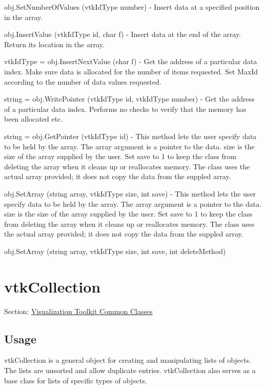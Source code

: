 \begin{DoxyItemize}
\item {\ttfamily obj.\-Set\-Number\-Of\-Values (vtk\-Id\-Type number)} -\/ Insert data at a specified position in the array.  
\item {\ttfamily obj.\-Insert\-Value (vtk\-Id\-Type id, char f)} -\/ Insert data at the end of the array. Return its location in the array.  
\item {\ttfamily vtk\-Id\-Type = obj.\-Insert\-Next\-Value (char f)} -\/ Get the address of a particular data index. Make sure data is allocated for the number of items requested. Set Max\-Id according to the number of data values requested.  
\item {\ttfamily string = obj.\-Write\-Pointer (vtk\-Id\-Type id, vtk\-Id\-Type number)} -\/ Get the address of a particular data index. Performs no checks to verify that the memory has been allocated etc.  
\item {\ttfamily string = obj.\-Get\-Pointer (vtk\-Id\-Type id)} -\/ This method lets the user specify data to be held by the array. The array argument is a pointer to the data. size is the size of the array supplied by the user. Set save to 1 to keep the class from deleting the array when it cleans up or reallocates memory. The class uses the actual array provided; it does not copy the data from the suppled array.  
\item {\ttfamily obj.\-Set\-Array (string array, vtk\-Id\-Type size, int save)} -\/ This method lets the user specify data to be held by the array. The array argument is a pointer to the data. size is the size of the array supplied by the user. Set save to 1 to keep the class from deleting the array when it cleans up or reallocates memory. The class uses the actual array provided; it does not copy the data from the suppled array.  
\item {\ttfamily obj.\-Set\-Array (string array, vtk\-Id\-Type size, int save, int delete\-Method)}  
\end{DoxyItemize}\hypertarget{vtkcommon_vtkcollection}{}\section{vtk\-Collection}\label{vtkcommon_vtkcollection}
Section\-: \hyperlink{sec_vtkcommon}{Visualization Toolkit Common Classes} \hypertarget{vtkwidgets_vtkxyplotwidget_Usage}{}\subsection{Usage}\label{vtkwidgets_vtkxyplotwidget_Usage}
vtk\-Collection is a general object for creating and manipulating lists of objects. The lists are unsorted and allow duplicate entries. vtk\-Collection also serves as a base class for lists of specific types of objects.

